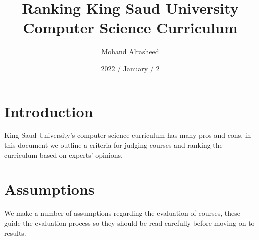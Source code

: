 \documentclass[12pt,a4paper]{article}
\title{Ranking King Saud University Computer Science Curriculum}
\author{Mohand Alrasheed}
\date{2022 / January / 2}
\begin{document}
\maketitle
\clearpage

\tableofcontents
\clearpage





\section{Introduction}
King Saud University's computer science curriculum has many pros and cons, in this document we outline a criteria for judging courses and ranking the curriculum based on experts' opinions.

\section{Assumptions} 
We make a number of assumptions regarding the evaluation of courses, these guide the evaluation process so they should be read carefully before moving on to results.
\end{document}
